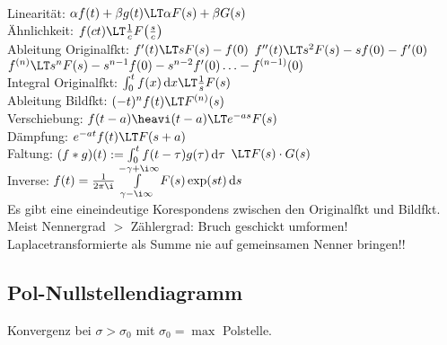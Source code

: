 \documentclass[german]{latex4ei/latex4ei_sheet}
\renewcommand{\diff}{\mathop{}\!\mathrm{\vphantom( d}}
\begin{document}
\begin{sectionbox}
\begin{tabular}{rl|rl}
	\end{tabular}\\
	\everymath{\textstyle}
	Linearität: $\alpha f(t) + \beta g(t) \LT \alpha F(s) + \beta G(s)$\\
	Ähnlichkeit: $f(ct) \LT \frac{1}{c} F\bigl(  \frac{s}{c} \bigr)$\\
	Ableitung Originalfkt: $f'(t) \LT s F(s) - f(0)$ \quad $f''(t) \LT s^2 F(s) - sf(0) - f'(0)$\\
	$f^{(n)} \LT s^n F(s) - s^{n-1} f(0) - s^{n-2} f'(0) \ldots - f^{(n-1)}(0)$\\
	Integral Originalfkt: $\int_0^t f(x) \diff x \LT \frac{1}{s} F(s)$\\
	Ableitung Bildfkt: $(-t)^n f(t) \LT F^{(n)} (s)$\\
	Verschiebung: $f(t-a)\heavi(t-a) \LT e^{-as} F(s)$\\
	Dämpfung: $e^{-at} f(t) \LT F(s+a)$\\
	Faltung: $(f * g)(t) := \int_0^t f( t - \tau) g(\tau) \diff \tau$ $\LT F(s) \cdot G(s)$\\
	Inverse: $f(t) = \frac{1}{2\pi \i} \int\limits_{\gamma - \i \infty}^{-\gamma + \i \infty} F(s) \exp(st) \diff s$\\
	Es gibt eine eineindeutige Korespondens zwischen den Originalfkt und Bildfkt.
	Meist Nennergrad $>$ Zählergrad: Bruch geschickt umformen!
	Laplacetransformierte als Summe nie auf gemeinsamen Nenner bringen!!


	\subsection{Pol-Nullstellendiagramm}
	Konvergenz bei $\sigma > \sigma_0$ mit $\sigma_0 = \max$ Polstelle.\\
\end{sectionbox}

\end{document}
